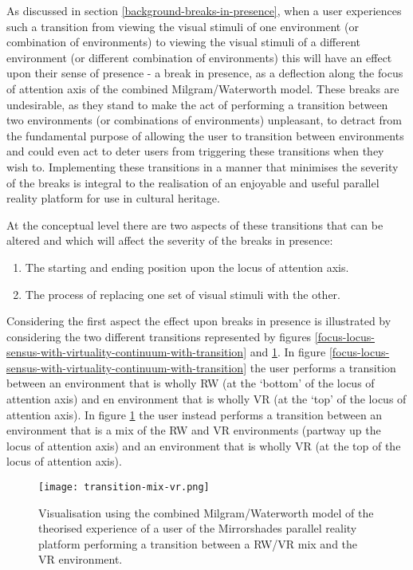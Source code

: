As discussed in section \ref{background-breaks-in-presence}, when a user experiences such a transition from viewing the visual stimuli of one environment (or combination of environments) to viewing the visual stimuli of a different environment (or different combination of environments) this will have an effect upon their sense of presence - a break in presence, as a deflection along the focus of attention axis of the combined Milgram/Waterworth model. These breaks are undesirable, as they stand to make the act of performing a transition between two environments (or combinations of environments) unpleasant, to detract from the fundamental purpose of allowing the user to transition between environments and could even act to deter users from triggering these transitions when they wish to. Implementing these transitions in a manner that minimises the severity of the breaks is integral to the realisation of an enjoyable and useful parallel reality platform for use in cultural heritage.

At the conceptual level there are two aspects of these transitions that can be altered and which will affect the severity of the breaks in presence:

\begin{enumerate}
	\item The starting and ending position upon the locus of attention axis.
	\item The process of replacing one set of visual stimuli with the other.
\end{enumerate}

Considering the first aspect the effect upon breaks in presence is illustrated by considering the two different transitions represented by figures \ref{focus-locus-sensus-with-virtuality-continuum-with-transition} and \ref{transition-mix-vr.png}. In figure \ref{focus-locus-sensus-with-virtuality-continuum-with-transition} the user performs a transition between an environment that is wholly RW (at the `bottom' of the locus of attention axis) and en environment that is wholly VR (at the `top' of the locus of attention axis). In figure \ref{transition-mix-vr.png} the user instead performs a transition between an environment that is a mix of the RW and VR environments (partway up the locus of attention axis) and an environment that is wholly VR (at the top of the locus of attention axis).

\begin{figure}[h]
	\begin{center}
		\texttt{[image: transition-mix-vr.png]}
		\caption{Visualisation using the combined Milgram/Waterworth model of the theorised experience of a user of the Mirrorshades parallel reality platform performing a transition between a RW/VR mix and the VR environment.}
		\label{transition-mix-vr.png}
	\end{center}
\end{figure}

